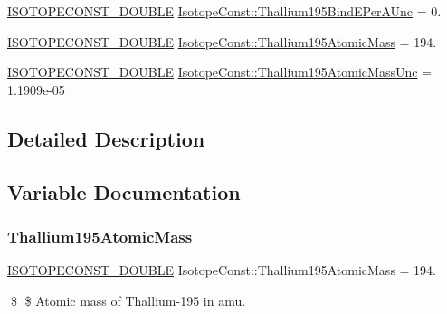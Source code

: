 \begin{DoxyCompactItemize}
\mbox{\hyperlink{group___isotope_const-_macros_ga8f45a7272ce02c0b4c65c44636ed719a}{I\+S\+O\+T\+O\+P\+E\+C\+O\+N\+S\+T\+\_\+\+D\+O\+U\+B\+LE}} \mbox{\hyperlink{group___isotope_const-_thallium-_tl195_ga73fdbc2d6ea89d10e21d46375d6c3d43}{Isotope\+Const\+::\+Thallium195\+Bind\+E\+Per\+A\+Unc}} = 0.
\item 
\mbox{\hyperlink{group___isotope_const-_macros_ga8f45a7272ce02c0b4c65c44636ed719a}{I\+S\+O\+T\+O\+P\+E\+C\+O\+N\+S\+T\+\_\+\+D\+O\+U\+B\+LE}} \mbox{\hyperlink{group___isotope_const-_thallium-_tl195_gaae0e76fe241f20652c0f5a2bc0b61a5a}{Isotope\+Const\+::\+Thallium195\+Atomic\+Mass}} = 194.
\item 
\mbox{\hyperlink{group___isotope_const-_macros_ga8f45a7272ce02c0b4c65c44636ed719a}{I\+S\+O\+T\+O\+P\+E\+C\+O\+N\+S\+T\+\_\+\+D\+O\+U\+B\+LE}} \mbox{\hyperlink{group___isotope_const-_thallium-_tl195_ga88d4d433d0b1ca65f6326ce21a1c1b62}{Isotope\+Const\+::\+Thallium195\+Atomic\+Mass\+Unc}} = 1.\+1909e-\/05
\end{DoxyCompactItemize}


\subsection{Detailed Description}


\subsection{Variable Documentation}
\mbox{\label{group___isotope_const-_thallium-_tl195_gaae0e76fe241f20652c0f5a2bc0b61a5a}} 
\subsubsection{\texorpdfstring{Thallium195\+Atomic\+Mass}{Thallium195AtomicMass}}
{\footnotesize\ttfamily \mbox{\hyperlink{group___isotope_const-_macros_ga8f45a7272ce02c0b4c65c44636ed719a}{I\+S\+O\+T\+O\+P\+E\+C\+O\+N\+S\+T\+\_\+\+D\+O\+U\+B\+LE}} Isotope\+Const\+::\+Thallium195\+Atomic\+Mass = 194.}

\$ \$ Atomic mass of Thallium-\/195 in amu. \mbox{\label{group___isotope_const-_thallium-_tl195_ga88d4d433d0b1ca65f6326ce21a1c1b62}} 
